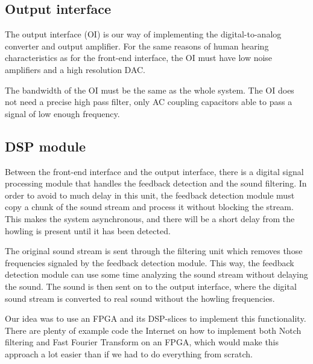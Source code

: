 \subsection{Output interface}
The output interface (OI) is our way of implementing the digital-to-analog converter and output amplifier. For the same reasons of human hearing characteristics as for the front-end interface, the OI must have low noise amplifiers and a high resolution DAC.  

The bandwidth of the OI  must be the same as the whole system. The OI does not need a precise high pass filter, only AC  coupling capacitors able to pass a signal of low enough frequency.  

\subsection{DSP module} 
Between the front-end interface and the output interface, there is a digital signal processing module that handles the feedback detection and the sound filtering.
In order to avoid to much delay in this unit, the feedback detection module must copy a chunk of the sound stream and process it without blocking the stream. This makes the
system asynchronous, and there will be a short delay from the howling is present until it has been detected.

The original sound stream is sent through the filtering unit which removes those frequencies signaled by the feedback detection module. This way, the feedback detection
module can use some time analyzing the sound stream without delaying the sound. The sound is then sent on to the output interface, where the digital sound stream is
converted to real sound without the howling frequencies.

Our idea was to use an FPGA  and its DSP-slices to implement this functionality. There are plenty of example code the Internet on how to implement both Notch filtering and 
Fast Fourier Transform  on an FPGA, which would make this approach a lot easier than if we had to do everything from scratch.
